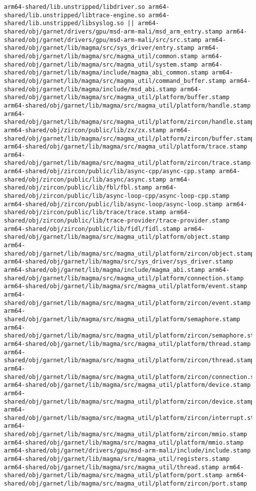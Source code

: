 \begin{verbatim}
arm64-shared/lib.unstripped/libdriver.so arm64-shared/lib.unstripped/libtrace-engine.so arm64-shared/lib.unstripped/libsyslog.so || arm64-shared/obj/garnet/drivers/gpu/msd-arm-mali/msd_arm_entry.stamp arm64-shared/obj/garnet/drivers/gpu/msd-arm-mali/src/src.stamp arm64-shared/obj/garnet/lib/magma/src/sys_driver/entry.stamp arm64-shared/obj/garnet/lib/magma/src/magma_util/common.stamp arm64-shared/obj/garnet/lib/magma/src/magma_util/system.stamp arm64-shared/obj/garnet/lib/magma/include/magma_abi_common.stamp arm64-shared/obj/garnet/lib/magma/src/magma_util/command_buffer.stamp arm64-shared/obj/garnet/lib/magma/include/msd_abi.stamp arm64-shared/obj/garnet/lib/magma/src/magma_util/platform/buffer.stamp arm64-shared/obj/garnet/lib/magma/src/magma_util/platform/handle.stamp arm64-shared/obj/garnet/lib/magma/src/magma_util/platform/zircon/handle.stamp arm64-shared/obj/zircon/public/lib/zx/zx.stamp arm64-shared/obj/garnet/lib/magma/src/magma_util/platform/zircon/buffer.stamp arm64-shared/obj/garnet/lib/magma/src/magma_util/platform/trace.stamp arm64-shared/obj/garnet/lib/magma/src/magma_util/platform/zircon/trace.stamp arm64-shared/obj/zircon/public/lib/async-cpp/async-cpp.stamp arm64-shared/obj/zircon/public/lib/async/async.stamp arm64-shared/obj/zircon/public/lib/fbl/fbl.stamp arm64-shared/obj/zircon/public/lib/async-loop-cpp/async-loop-cpp.stamp arm64-shared/obj/zircon/public/lib/async-loop/async-loop.stamp arm64-shared/obj/zircon/public/lib/trace/trace.stamp arm64-shared/obj/zircon/public/lib/trace-provider/trace-provider.stamp arm64-shared/obj/zircon/public/lib/fidl/fidl.stamp arm64-shared/obj/garnet/lib/magma/src/magma_util/platform/object.stamp arm64-shared/obj/garnet/lib/magma/src/magma_util/platform/zircon/object.stamp arm64-shared/obj/garnet/lib/magma/src/sys_driver/sys_driver.stamp arm64-shared/obj/garnet/lib/magma/include/magma_abi.stamp arm64-shared/obj/garnet/lib/magma/src/magma_util/platform/connection.stamp arm64-shared/obj/garnet/lib/magma/src/magma_util/platform/event.stamp arm64-shared/obj/garnet/lib/magma/src/magma_util/platform/zircon/event.stamp arm64-shared/obj/garnet/lib/magma/src/magma_util/platform/semaphore.stamp arm64-shared/obj/garnet/lib/magma/src/magma_util/platform/zircon/semaphore.stamp arm64-shared/obj/garnet/lib/magma/src/magma_util/platform/thread.stamp arm64-shared/obj/garnet/lib/magma/src/magma_util/platform/zircon/thread.stamp arm64-shared/obj/garnet/lib/magma/src/magma_util/platform/zircon/connection.stamp arm64-shared/obj/garnet/lib/magma/src/magma_util/platform/device.stamp arm64-shared/obj/garnet/lib/magma/src/magma_util/platform/zircon/device.stamp arm64-shared/obj/garnet/lib/magma/src/magma_util/platform/zircon/interrupt.stamp arm64-shared/obj/garnet/lib/magma/src/magma_util/platform/zircon/mmio.stamp arm64-shared/obj/garnet/lib/magma/src/magma_util/platform/mmio.stamp arm64-shared/obj/garnet/drivers/gpu/msd-arm-mali/include/include.stamp arm64-shared/obj/garnet/lib/magma/src/magma_util/registers.stamp arm64-shared/obj/garnet/lib/magma/src/magma_util/thread.stamp arm64-shared/obj/garnet/lib/magma/src/magma_util/platform/port.stamp arm64-shared/obj/garnet/lib/magma/src/magma_util/platform/zircon/port.stamp


\end{verbatim}
